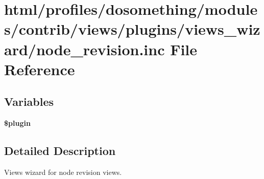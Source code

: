 \hypertarget{node__revision_8inc}{
\section{html/profiles/dosomething/modules/contrib/views/plugins/views\_\-wizard/node\_\-revision.inc File Reference}
\label{node__revision_8inc}
}
\subsection*{Variables}
\begin{DoxyCompactItemize}
\item 
\hypertarget{node__revision_8inc_ada8a7130088351710bb02ed622d6bf65}{
{\bfseries \$plugin}}
\label{node__revision_8inc_ada8a7130088351710bb02ed622d6bf65}

\end{DoxyCompactItemize}


\subsection{Detailed Description}
Views wizard for node revision views. 